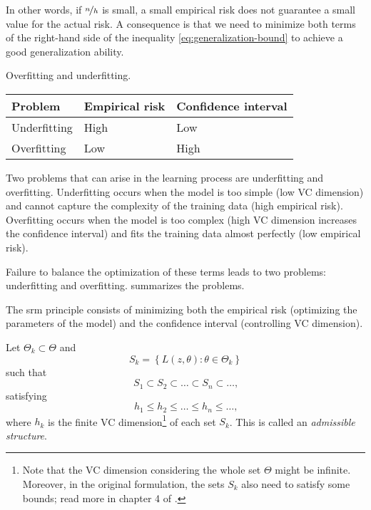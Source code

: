 In other words, if $\nicefrac{n}{h}$ is small, a small empirical risk does not guarantee a small value
for the actual risk.  A consequence is that we need to minimize both terms of the
right-hand side of the inequality \cref{eq:generalization-bound} to achieve a good
generalization ability.

\begin{tablebox}[label=tab:overfit-underfit]{Overfitting and underfitting.}
  \centering
  \begin{tabular}{lll}
    \toprule
    \textbf{Problem} & \textbf{Empirical risk} & \textbf{Confidence interval} \\
    \midrule
    Underfitting & High & Low \\
    Overfitting & Low & High \\
    \bottomrule
  \end{tabular}
  \tcblower
  Two problems that can arise in the learning process are underfitting and overfitting.
  Underfitting occurs when the model is too simple (low VC dimension) and cannot capture
  the complexity of the training data (high empirical risk).  Overfitting occurs when the
  model is too complex (high VC dimension increases the confidence interval) and fits the
  training data almost perfectly (low empirical risk).
\end{tablebox}

Failure to balance the optimization of these terms leads to two problems: underfitting and
overfitting.   summarizes the problems.

The \gls{srm} principle consists of minimizing both the empirical risk (optimizing the
parameters of the model) and the confidence interval (controlling VC dimension).

Let $\Theta_k \subset \Theta$ and
\[
  S_k = \left\{ L(z, \theta) : \theta \in \Theta_k \right\}
\]
such that
\[
  S_1 \subset S_2 \subset \dots \subset S_n \subset \dots\text{,}
\]
satisfying
\[
  h_1 \leq h_2 \leq \dots \leq h_n \leq \dots\text{,}
\]
where $h_k$ is the finite VC dimension\footnote{Note that the VC dimension considering the
whole set $\Theta$ might be infinite.  Moreover, in the original formulation, the sets
$S_k$ also need to satisfy some bounds; read more in chapter 4 of .}
of each set $S_k$.  This is called an \emph{admissible structure}.

